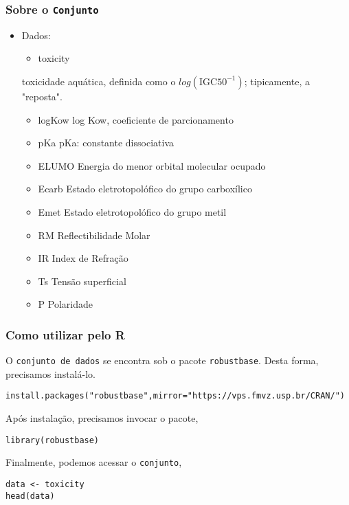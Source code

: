 \documentclass[11pt]{article}
\begin{document}
\subsubsection{Sobre o \texttt{Conjunto}}
\label{sec:org5bab13b}
\begin{itemize}
\item Dados:
\begin{itemize}
\item toxicity
\end{itemize}
toxicidade  aquática, definida como o \(log(\textrm{IGC50}^{-1})\); tipicamente, a "reposta".
\begin{itemize}
\item logKow
log Kow, coeficiente de parcionamento
\item pKa
pKa: constante dissociativa
\item ELUMO
Energia do menor orbital molecular ocupado
\item Ecarb
Estado eletrotopolófico do grupo carboxílico
\item Emet
Estado eletrotopolófico do grupo metil
\item RM
Reflectibilidade Molar
\item IR
Index de Refração
\item Ts
Tensão superficial
\item P
Polaridade
\end{itemize}
\end{itemize}
\subsubsection{Como utilizar pelo R}
\label{sec:org57fd626}
O \texttt{conjunto de dados} se encontra sob o pacote \texttt{robustbase}. Desta forma, precisamos
instalá-lo.

\begin{verbatim}
install.packages("robustbase",mirror="https://vps.fmvz.usp.br/CRAN/")
\end{verbatim}

Após instalação, precisamos invocar o pacote,
\begin{verbatim}
library(robustbase)
\end{verbatim}

Finalmente, podemos acessar o \texttt{conjunto},
\begin{verbatim}
data <- toxicity
head(data)
\end{verbatim}
\end{document}
